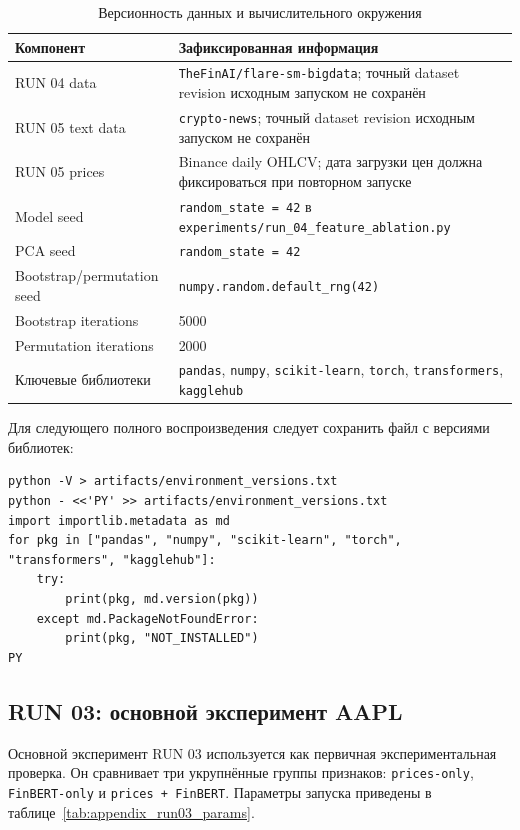 \begin{table}[htbp]
\centering
\begin{tabular}{lp{9cm}}
\toprule
Компонент & Зафиксированная информация \\
\midrule
RUN 04 data & \texttt{TheFinAI/flare-sm-bigdata}; точный dataset revision исходным запуском не сохранён \\
RUN 05 text data & \texttt{crypto-news}; точный dataset revision исходным запуском не сохранён \\
RUN 05 prices & Binance daily OHLCV; дата загрузки цен должна фиксироваться при повторном запуске \\
Model seed & \texttt{random\_state = 42} в \texttt{experiments/run\_04\_feature\_ablation.py} \\
PCA seed & \texttt{random\_state = 42} \\
Bootstrap/permutation seed & \texttt{numpy.random.default\_rng(42)} \\
Bootstrap iterations & 5000 \\
Permutation iterations & 2000 \\
Ключевые библиотеки & \texttt{pandas}, \texttt{numpy}, \texttt{scikit-learn}, \texttt{torch}, \texttt{transformers}, \texttt{kagglehub} \\
\bottomrule
\end{tabular}
\caption{Версионность данных и вычислительного окружения}
\label{tab:appendix_versions}
\end{table}

Для следующего полного воспроизведения следует сохранить файл с версиями библиотек:

\begin{Verbatim}[fontsize=\small]
python -V > artifacts/environment_versions.txt
python - <<'PY' >> artifacts/environment_versions.txt
import importlib.metadata as md
for pkg in ["pandas", "numpy", "scikit-learn", "torch", "transformers", "kagglehub"]:
    try:
        print(pkg, md.version(pkg))
    except md.PackageNotFoundError:
        print(pkg, "NOT_INSTALLED")
PY
\end{Verbatim}

\subsection*{RUN 03: основной эксперимент AAPL}

Основной эксперимент RUN 03 используется как первичная экспериментальная проверка. Он сравнивает три укрупнённые группы признаков: \texttt{prices-only}, \texttt{FinBERT-only} и \texttt{prices + FinBERT}. Параметры запуска приведены в таблице~\ref{tab:appendix_run03_params}.

